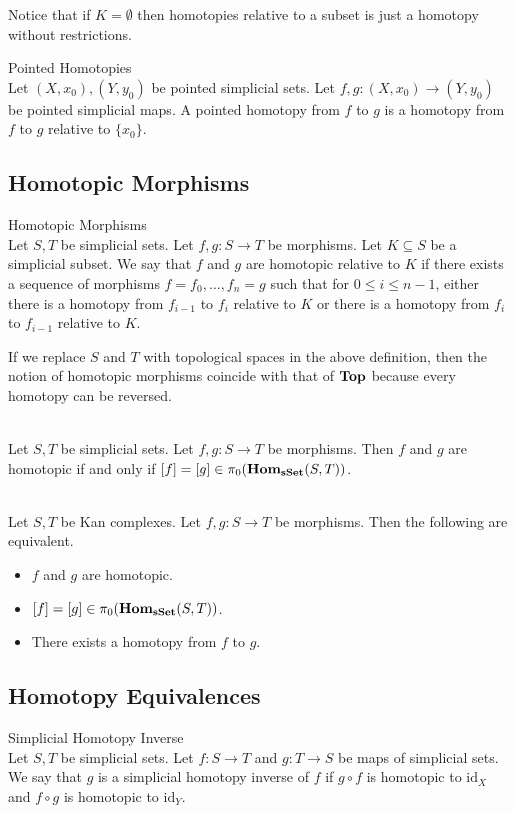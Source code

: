 \documentclass[a4paper]{article}
\begin{document}
Notice that if $K=\emptyset$ then homotopies relative to a subset is just a homotopy without restrictions. 

\begin{defn}{Pointed Homotopies}{}\\
Let $(X,x_0),(Y,y_0)$ be pointed simplicial sets. Let $f,g:(X,x_0)\to(Y,y_0)$ be pointed simplicial maps. A pointed homotopy from $f$ to $g$ is a homotopy from $f$ to $g$ relative to $\{x_0\}$. 
\end{defn}

\subsection{Homotopic Morphisms}
\begin{defn}{Homotopic Morphisms}{}\\
Let $S,T$ be simplicial sets. Let $f,g:S\to T$ be morphisms. Let $K\subseteq S$ be a simplicial subset. We say that $f$ and $g$ are homotopic relative to $K$ if there exists a sequence of morphisms $f=f_0,\dots,f_n=g$ such that for $0\leq i\leq n-1$, either there is a homotopy from $f_{i-1}$ to $f_i$ relative to $K$ or there is a homotopy from $f_i$ to $f_{i-1}$ relative to $K$. 
\end{defn}

If we replace $S$ and $T$ with topological spaces in the above definition, then the notion of homotopic morphisms coincide with that of $\bold{Top}$ because every homotopy can be reversed. 

\begin{prp}{}{}\\
Let $S,T$ be simplicial sets. Let $f,g:S\to T$ be morphisms. Then $f$ and $g$ are homotopic if and only if $[f]=[g]\in\pi_0(\bold{Hom}_{\bold{sSet}}(S,T))$. 
\end{prp}

\begin{prp}{}{}\\
Let $S,T$ be Kan complexes. Let $f,g:S\to T$ be morphisms. Then the following are equivalent. 
\begin{itemize}
\item $f$ and $g$ are homotopic. 
\item $[f]=[g]\in\pi_0(\bold{Hom}_{\bold{sSet}}(S,T))$. 
\item There exists a homotopy from $f$ to $g$. 
\end{itemize}
\end{prp}

\subsection{Homotopy Equivalences}
\begin{defn}{Simplicial Homotopy Inverse}{}\\
Let $S,T$ be simplicial sets. Let $f:S\to T$ and $g:T\to S$ be maps of simplicial sets. We say that $g$ is a simplicial homotopy inverse of $f$ if $g\circ f$ is homotopic to $\text{id}_X$ and $f\circ g$ is homotopic to $\text{id}_Y$. 
\end{defn}
\end{document}
